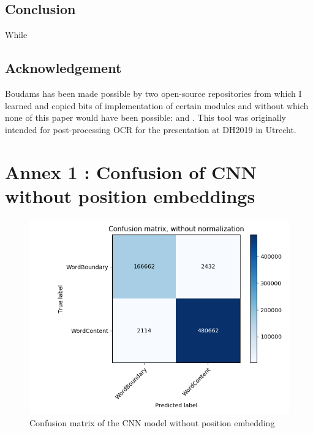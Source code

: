 \documentclass{jdmdh}
\begin{document}
\subsection{Conclusion}

While

\subsection{Acknowledgement}

Boudams has been made possible by two open-source repositories from which I learned and copied bits of implementation of certain modules and without which none of this paper would have been possible: \citet{enrique_manjavacas_2019_2654987} and \citet{bentrevett}. This tool was originally intended for post-processing OCR for the presentation \citet{pinchecampsclerice} at DH2019 in Utrecht.






\appendix\footnotesize

\section{Annex 1 : Confusion of CNN without position embeddings}

\begin{figure}
  \centering
  \includegraphics[width=\linewidth]{confusion.png}
  \caption{Confusion matrix of the CNN model without position embedding}
  \label{fig:confusion_matrix}
\end{figure}
\end{document}
